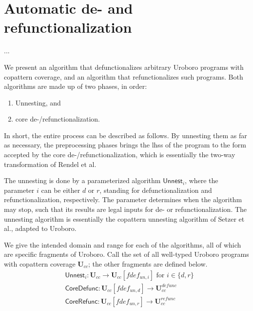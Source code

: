 \chapter{Automatic de- and refunctionalization}


...

We present an algorithm that defunctionalizes arbitrary Uroboro programs with copattern coverage, and an algorithm that refunctionalizes such programs. Both algorithms are made up of two phases, in order:
\begin{enumerate}
\item Unnesting, and
\item core de-/refunctionalization.
\end{enumerate}

In short, the entire process can be described as follows. By unnesting them as far as necessary, the preprocessing phases brings the lhss of the program to the form accepted by the core de-/refunctionalization, which is essentially the two-way transformation of Rendel et al.

The unnesting is done by a parameterized algorithm $\textsf{Unnest}_i$, where the parameter $i$ can be either $d$ or $r$, standing for defunctionalization and refunctionalization, respectively. The parameter determines when the algorithm may stop, such that its results are legal inputs for de- or refunctionalization. The unnesting algorithm is essentially the copattern unnesting algorithm of Setzer et al., adapted to Uroboro.

We give the intended domain and range for each of the algorithms, all of which are specific fragments of Uroboro. Call the set of all well-typed Uroboro programs with copattern coverage $\mathbf{U}_{cc}$; the other fragments are defined below.
\begin{align*}
& \textsf{Unnest}_i: \mathbf{U}_{cc} \to \mathbf{U}_{cc}[fdef_{un,i}] \text{ for } i \in \{d,r\} \\
& \textsf{CoreDefunc}: \mathbf{U}_{cc}[fdef_{un,d}] \to \mathbf{U}^{defunc}_{cc} \\
& \textsf{CoreRefunc}: \mathbf{U}_{cc}[fdef_{un,r}] \to \mathbf{U}^{refunc}_{cc}
\end{align*}

